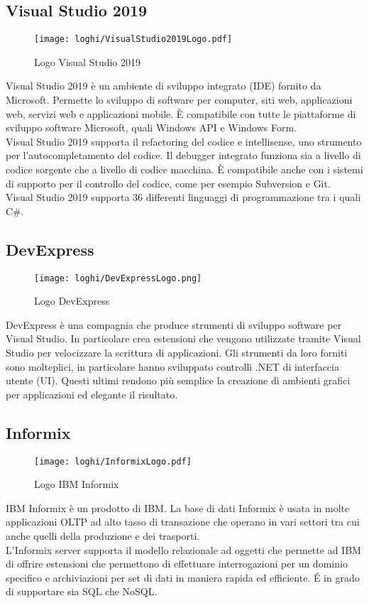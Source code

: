 \subsection*{Visual Studio 2019}
\begin{figure}[!h] 
    \centering 
    \texttt{[image: loghi/VisualStudio2019Logo.pdf]} 
    \caption{Logo Visual Studio 2019}
 \end{figure}
\noindent Visual Studio 2019 è un ambiente di sviluppo integrato (IDE) fornito da Microsoft.
Permette lo sviluppo di software per computer, siti web, applicazioni web, servizi web
e applicazioni mobile. È compatibile con tutte le piattaforme di sviluppo
software Microsoft, quali Windows API e Windows Form.\\
Visual Studio 2019 supporta il refactoring del codice e intellisense, uno strumento per
l’autocompletamento del codice. Il debugger integrato funziona sia a
livello di codice sorgente che a livello di codice macchina. È compatibile anche con i sistemi di supporto per il controllo del codice,
come per esempio Subversion e Git.\\
Visual Studio 2019 supporta 36 differenti linguaggi di 
programmazione tra i quali C\#.

\subsection*{DevExpress}
\begin{figure}[!h] 
    \centering 
    \texttt{[image: loghi/DevExpressLogo.png]}
    \caption{Logo DevExpress}
\end{figure}
\noindent DevExpress è una compagnia che produce strumenti di sviluppo software per
Visual Studio. In particolare crea estensioni che vengono utilizzate tramite Visual
Studio per velocizzare la scrittura di applicazioni. Gli strumenti da loro forniti sono
molteplici, in particolare hanno sviluppato controlli .NET di interfaccia utente (UI).
Questi ultimi rendono più semplice la creazione di ambienti grafici per applicazioni ed
elegante il risultato.

\subsection*{Informix}
\begin{figure}[!h] 
    \centering 
    \texttt{[image: loghi/InformixLogo.pdf]}
    \caption{Logo IBM Informix}
\end{figure}
\noindent IBM Informix è un prodotto di IBM. La base di dati Informix è usata in molte
applicazioni OLTP ad alto tasso di transazione che operano in vari settori tra cui anche quelli della produzione e dei trasporti.\\
L’Informix server supporta il modello relazionale ad oggetti che permette ad IBM di
offrire estensioni che permettono di effettuare interrogazioni per un dominio specifico
e archiviazioni per set di dati in maniera rapida ed efficiente.
É in grado di supportare sia SQL che NoSQL.

